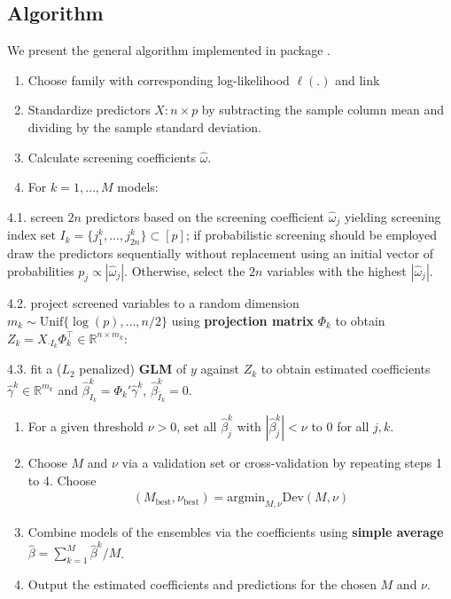 \documentclass[
  article]{jss}
\begin{document}
\subsection{Algorithm}\label{sec-algo}

We present the general algorithm implemented in package .

\begin{enumerate}
\def\labelenumi{\arabic{enumi}.}
\item
  Choose family with corresponding log-likelihood \(\ell(.)\) and link
\item
  Standardize predictors \(X:n\times p\) by subtracting the sample
  column mean and dividing by the sample standard deviation.
\item
  Calculate screening coefficients \(\hat\omega\).
\item
  For \(k=1,\dots,M\) models:
\end{enumerate}

4.1. screen \(2n\) predictors based on the screening coefficient
\(\hat\omega_j\) yielding screening index set
\(I_k=\{j_1^k,\dots,j_{2n}^k\}\subset[p]\); if probabilistic screening
should be employed draw the predictors sequentially without replacement
using an initial vector of probabilities \(p_j\propto |\hat\omega_j|\).
Otherwise, select the \(2n\) variables with the highest
\(|\hat\omega_j|\).

4.2. project screened variables to a random dimension
\(m_k\sim \text{Unif}\{\log(p),\dots,n/2\}\) using
\textbf{projection matrix} \(\Phi_k\) to obtain
\(Z_k=X_{\cdot I_k}\Phi_k^\top \in \mathbb{R}^{n\times m_k}\):

4.3. fit a (\(L_2\) penalized) \textbf{GLM} of \(y\) against \(Z_k\) to
obtain estimated coefficients \(\widehat\gamma^k\in\mathbb{R}^{m_k}\)
and \(\hat \beta_{I_k}^k=\Phi_k'\widehat\gamma^k\),
\(\hat \beta_{\bar I_k}^k=0\).

\begin{enumerate}
\def\labelenumi{\arabic{enumi}.}
\setcounter{enumi}{4}
\item
  For a given threshold \(\nu>0\), set all \(\hat\beta_j^k\) with
  \(|\hat\beta_j^k|<\nu\) to \(0\) for all \(j,k\).
\item
  Choose \(M\) and \(\nu\) via a validation set or cross-validation by
  repeating steps 1 to 4. Choose \begin{align}
      (M_{\text{best}},\nu_{\text{best}}) = \text{argmin}_{M,\nu}\text{Dev}(M,\nu)
    \end{align}
\item
  Combine models of the ensembles via the coefficients using
  \textbf{simple average} \(\hat \beta = \sum_{k=1}^M\hat \beta^k / M\).
\item
  Output the estimated coefficients and predictions for the chosen \(M\)
  and \(\nu\).
\end{enumerate}
\end{document}
